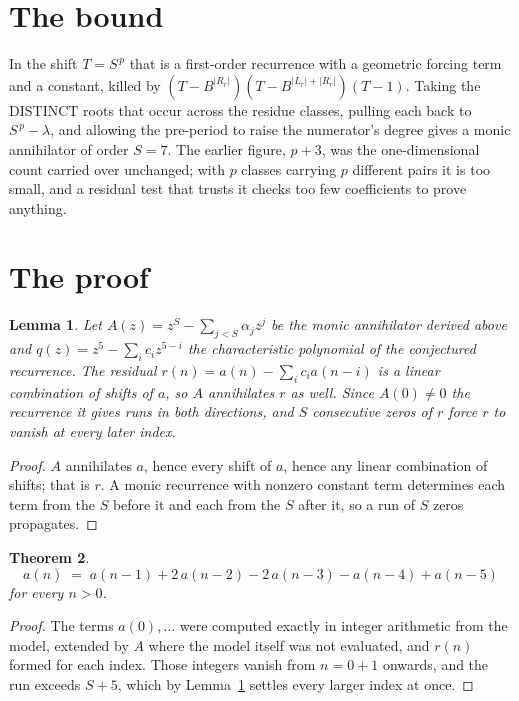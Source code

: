\documentclass[11pt,a4paper]{article}
\theoremstyle{plain}
\newtheorem{theorem}{Theorem}
\newtheorem{lemma}[theorem]{Lemma}
\theoremstyle{definition}
\begin{document}
\section{The bound}

In the shift $T=S^{\,p}$ that is a first-order recurrence with a geometric forcing term and a
constant, killed by $(T-B^{|R_r|})(T-B^{|L_r|+|R_r|})(T-1)$. Taking the DISTINCT roots that
occur across the residue classes, pulling each back to $S^{\,p}-\lambda$, and allowing the
pre-period to raise the numerator's degree gives a monic annihilator of order $S=7$. The
earlier figure, $p+3$, was the one-dimensional count carried over unchanged; with $p$ classes
carrying $p$ different pairs it is too small, and a residual test that trusts it checks too few
coefficients to prove anything.

\section{The proof}

\begin{lemma}\label{lem:crit}
Let $A(z)=z^S-\sum_{j<S}\alpha_jz^{j}$ be the monic annihilator derived above and
$q(z)=z^{5}-\sum_ic_iz^{5-i}$ the characteristic polynomial of the conjectured
recurrence. The residual $r(n)=a(n)-\sum_ic_ia(n-i)$ is a linear combination of shifts of $a$,
so $A$ annihilates $r$ as well. Since $A(0)\ne0$ the recurrence it gives runs in both
directions, and $S$ consecutive zeros of $r$ force $r$ to vanish at every later index.
\end{lemma}

\begin{proof}
$A$ annihilates $a$, hence every shift of $a$, hence any linear combination of shifts; that is
$r$. A monic recurrence with nonzero constant term determines each term from the $S$ before it
and each from the $S$ after it, so a run of $S$ zeros propagates.
\end{proof}

\begin{theorem}
\[
a(n)\;=\;a(n-1) + 2\,a(n-2) - 2\,a(n-3) - a(n-4) + a(n-5)
\]
for every $n>0$.
\end{theorem}

\begin{proof}
The terms $a(0),\dots$ were computed exactly in integer arithmetic from the model, extended by
$A$ where the model itself was not evaluated, and $r(n)$ formed for each index. Those integers
vanish from $n=0+1$ onwards, and the run exceeds $S+5$, which by
Lemma~\ref{lem:crit} settles every larger index at once.
\end{proof}
\end{document}
